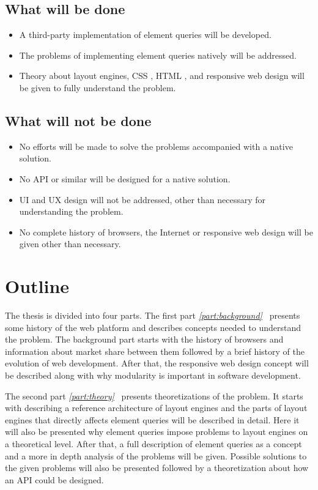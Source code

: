 \documentclass[a4paper,11pt]{kth-mag}
\newcommand\abbr[2][]{\uppercase{#2}\ifthenelse{\equal{#1}{}}%
                     {}{#1}}
\begin{document}
      \subsection{What will be done}
      \begin{itemize}
      \item A third-party implementation of element queries will be developed.
      \item The problems of implementing element queries natively will be addressed.
      \item Theory about layout engines, \abbr{css}, \abbr{html}, and responsive web design will be given to fully understand the problem. 
      \end{itemize}

      \subsection{What will not be done}
      \begin{itemize}
      \item No efforts will be made to solve the problems accompanied with a native solution.
      \item No \abbr{api} or similar will be designed for a native solution.
      \item \abbr{ui} and \abbr{ux} design will not be addressed, other than necessary for understanding the problem.
      \item No complete history of browsers, the Internet or responsive web design will be given other than necessary.
      \end{itemize}
    \section{Outline}
      The thesis is divided into four parts. The first part \emph{\ref{part:background}~} presents some history of the web platform and describes concepts needed to understand the problem.
      The background part starts with the history of browsers and information about market share between them followed by a brief history of the evolution of web development.
      After that, the responsive web design concept will be described along with why modularity is important in software development.

      The second part \emph{\ref{part:theory}~} presents theoretizations of the problem.
      It starts with describing a reference architecture of layout engines and the parts of layout engines that directly affects element queries will be described in detail.
      Here it will also be presented why element queries impose problems to layout engines on a theoretical level.
      After that, a full description of element queries as a concept and a more in depth analysis of the problems will be given.
      Possible solutions to the given problems will also be presented followed by a theoretization about how an \abbr{api} could be designed. 
\end{document}
